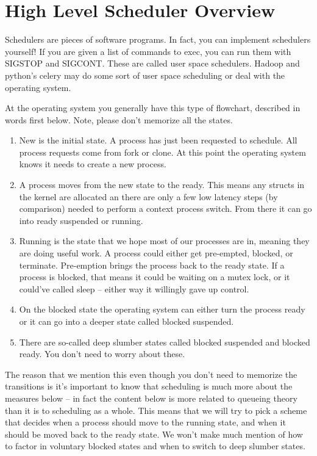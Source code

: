 \section{High Level Scheduler Overview}

Schedulers are pieces of software programs. In fact, you can implement schedulers yourself!
If you are given a list of commands to exec, you can run them with SIGSTOP and SIGCONT.
These are called user space schedulers.
Hadoop and python's celery may do some sort of user space scheduling or deal with the operating system.

At the operating system you generally have this type of flowchart, described in words first below.
Note, please don't memorize all the states.

\begin{enumerate}
\item New is the initial state. A process has just been requested to schedule. All process requests come from fork or clone. At this point the operating system knows it needs to create a new process.
\item A process moves from the new state to the ready. This means any structs in the kernel are allocated an there are only a few low latency steps (by comparison) needed to perform a context process switch. From there it can go into ready suspended or running.
\item Running is the state that we hope most of our processes are in, meaning they are doing useful work. A process could either get pre-empted, blocked, or terminate. Pre-emption brings the process back to the ready state. If a process is blocked, that means it could be waiting on a mutex lock, or it could've called sleep -- either way it willingly gave up control.
\item On the blocked state the operating system can either turn the process ready or it can go into a deeper state called blocked suspended.
\item There are so-called deep slumber states called blocked suspended and blocked ready. You don't need to worry about these.
\end{enumerate}

The reason that we mention this even though you don't need to memorize the transitions is it's important to know that scheduling is much more about the measures below -- in fact the content below is more related to queueing theory than it is to scheduling as a whole.
This means that we will try to pick a scheme that decides when a process should move to the running state, and when it should be moved back to the ready state.
We won't make much mention of how to factor in voluntary blocked states and when to switch to deep slumber states.

